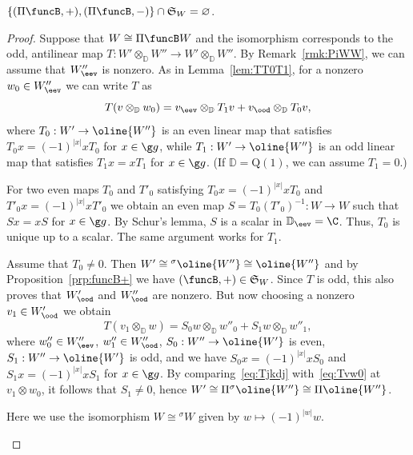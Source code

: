 \documentclass[12pt]{amsart}
\begin{document}
\begin{prp}
\label{prp:PiB+PiB-}
$\{(\Pi\funcB,+),(\Pi\funcB,-)\}\cap \mathfrak S_W=\varnothing$.
\end{prp}
\begin{proof}
Suppose that $W\cong \Pi\funcB W$ and the isomorphism corresponds to the odd, antilinear map $
T:W'\otimes_\mathbb D W''\to W'\otimes_\mathbb D W''$.  
By Remark~\ref{rmk:PiWW}, we can assume that $W''_\eev$ is nonzero. As in Lemma~\ref{lem:TT0T1}, for a nonzero $w_0\in W''_\eev$ we can write $T$ as
\begin{equation}
\label{eq:Tvw0}
T(v\otimes_\mathbb D w_0)=v_\eev\otimes_\mathbb D T_1 v+v_\ood\otimes_\mathbb D T_0v,
\end{equation}
where $T_0:W'\to \oline{W''}$ is an even linear map that satisfies $T_0x=(-1)^{|x|}xT_0$ for $x\in\g g$, while $T_1:W'\to \oline{W''}$ is an odd linear map that  satisfies $T_1x= xT_1$ for $x\in\g g$. 
(If $\mathbb D=\mathrm Q(1)$, we can assume $T_1=0$.)

\begin{details}
For two even maps $T_0$ and $T'_0$ satisfying $T_0x=(-1)^{|x|}xT_0$ and $T'_0x=(-1)^{|x|}xT'_0$ we obtain an even map $S=T_0(T'_0)^{-1}:W\to W$ such that $Sx=xS$ for $x\in\g g$. By Schur's lemma, $S$ is a scalar in $\mathbb D_\eev=\C$. Thus, $T_0$ is unique up to a scalar. The same argument works for $T_1$. 
\end{details}

Assume that $T_0\neq 0$. Then $W'\cong {^\sigma\oline{W''}}\cong \oline{W''}$ and by Proposition~\ref{prp:funcB+} we have $(\funcB,+)\in\mathfrak S_W$. 
Since $T$ is odd, this also proves that $W'_\ood$ and $W''_\ood$ are nonzero. But now choosing a nonzero $v_1\in W'_\ood$ we obtain
\begin{equation}
\label{eq:Tjkdj}
T(v_1\otimes_\mathbb D w)=S_0 w\otimes_\mathbb D w''_0+S_1w\otimes_\mathbb D w''_1,
\end{equation}
where 
$w_0''\in W''_\eev$, $w''_1\in W''_\ood$, 
$S_0:W''\to \oline{W'}$ is even, $S_1:W''\to \oline{W'}$ is odd, and we have $S_0x=(-1)^{|x|}xS_0$ and $S_1x=(-1)^{|x|}xS_1$ for $x\in \g g$. 
By comparing~\eqref{eq:Tjkdj} with~\eqref{eq:Tvw0} at $v_1\otimes w_0$, it follows that  $S_1\neq 0$, hence  $W'\cong \Pi{^\sigma \oline{W''}}\cong \Pi \oline{W''}$.

\begin{details}
Here we use the isomorphism $W\cong {^\sigma W}$ given by $w\mapsto (-1)^{|w|}w$.
\end{details} 


\end{proof}
\end{document}
